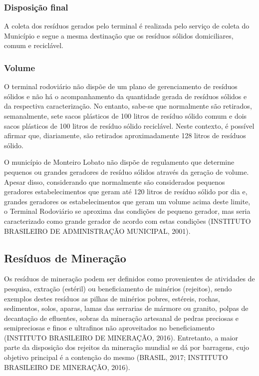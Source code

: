 	\subsubsection{Disposição final}
	A coleta dos resíduos gerados pelo terminal é realizada pelo serviço de coleta do Município e segue a mesma destinação que os resíduos sólidos domiciliares, comum e reciclável. 
	
	\subsubsection{Volume}
	O terminal rodoviário não dispõe de um plano de gerenciamento de resíduos sólidos e não há o acompanhamento da quantidade gerada de resíduos sólidos e da respectiva caracterização. No entanto, sabe-se que normalmente são retirados, semanalmente, sete sacos plásticos de 100 litros de resíduo sólido comum e dois sacos plásticos de 100 litros de resíduo sólido reciclável. Neste contexto, é possível afirmar que, diariamente, são retirados aproximadamente 128 litros de resíduos sólido.

	O município de Monteiro Lobato não dispõe de regulamento que determine pequenos ou grandes geradores de resíduo sólidos através da geração de volume. Apesar disso, considerando que normalmente são considerados pequenos geradores estabelecimentos que geram até 120 litros de resíduo sólido por dia e, grandes geradores os estabelecimentos que geram um volume acima deste limite, o Terminal Rodoviário se aproxima das condições de pequeno gerador, mas seria caracterizado como grande gerador de acordo com estas condições (INSTITUTO BRASILEIRO DE ADMINISTRAÇÃO MUNICIPAL, 2001).
	
	
	\subsection{Resíduos de Mineração}
	Os resíduos de mineração podem ser definidos como provenientes de atividades de pesquisa, extração (estéril) ou beneficiamento de minérios (rejeitos), sendo exemplos destes resíduos as pilhas de minérios pobres, estéreis, rochas, sedimentos, solos, aparas, lamas das serrarias de mármore ou granito, polpas de decantação de efluentes, sobras da mineração artesanal de pedras preciosas e semipreciosas e finos e ultrafinos não aproveitados no beneficiamento (INSTITUTO BRASILEIRO DE MINERAÇÃO, 2016). Entretanto, a maior parte da disposição dos rejeitos da mineração mundial se dá por barragens, cujo objetivo principal é a contenção do mesmo (BRASIL, 2017; INSTITUTO BRASILEIRO DE MINERAÇÃO, 2016).
	
